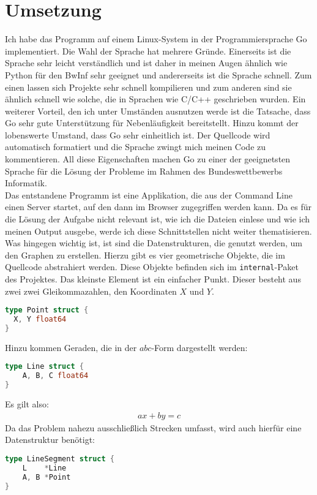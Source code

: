 \documentclass[a4paper,10pt,ngerman]{scrartcl}
\begin{document}
\section{Umsetzung}
Ich habe das Programm auf einem Linux-System in der Programmiersprache Go implementiert. Die Wahl der Sprache hat mehrere Gründe. Einerseits ist die Sprache sehr leicht verständlich und ist daher in meinen Augen ähnlich wie Python für den BwInf sehr geeignet und andererseits ist die Sprache schnell. Zum einen lassen sich Projekte sehr schnell kompilieren und zum anderen sind sie ähnlich schnell wie solche, die in Sprachen wie C/C++ geschrieben wurden. Ein weiterer Vorteil, den ich unter Umständen ausnutzen werde ist die Tatsache, dass Go sehr gute Unterstützung für Nebenläufigkeit bereitstellt. Hinzu kommt der lobenswerte Umstand, dass Go sehr einheitlich ist. Der Quellcode wird automatisch formatiert und die Sprache zwingt mich meinen Code zu kommentieren. All diese Eigenschaften machen Go zu einer der geeignetsten Sprache für die Lösung der Probleme im Rahmen des Bundeswettbewerbs Informatik.\\
Das entstandene Programm ist eine Applikation, die aus der Command Line einen Server startet, auf den dann im Browser zugegriffen werden kann. Da es für die Lösung der Aufgabe nicht relevant ist, wie ich die Dateien einlese und wie ich meinen Output ausgebe, werde ich diese Schnittstellen nicht weiter thematisieren.\\
Was hingegen wichtig ist, ist sind die Datenstrukturen, die genutzt werden, um den Graphen zu erstellen. Hierzu gibt es vier geometrische Objekte, die im Quellcode abstrahiert werden. Diese Objekte befinden sich im \texttt{internal}-Paket des Projektes. Das kleinste Element ist ein einfacher Punkt. Dieser besteht aus zwei zwei Gleikommazahlen, den Koordinaten $X$ und $Y$.
\begin{lstlisting}[language=Go]
type Point struct {
  X, Y float64
}
\end{lstlisting}
Hinzu kommen Geraden, die in der $abc$-Form dargestellt werden:
\begin{lstlisting}[language=Go]
type Line struct {
	A, B, C float64
}
\end{lstlisting}
Es gilt also:
\begin{align}
  ax + by = c 
\end{align}
Da das Problem nahezu ausschlie\ss lich Strecken umfasst, wird auch hierfür eine Datenstruktur benötigt:
\begin{lstlisting}[language=Go]
type LineSegment struct {
	L    *Line
	A, B *Point
} 
\end{lstlisting}
\end{document}
